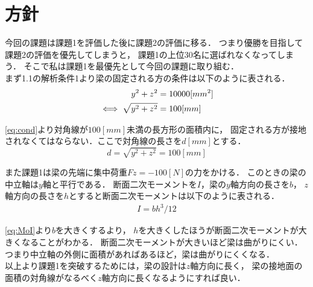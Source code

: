\section{方針}
  今回の課題は課題1を評価した後に課題2の評価に移る．
  つまり優勝を目指して課題2の評価を優先してしまうと，
  課題1の上位30名に選ばれなくなってしまう．
  そこで私は課題1を最優先として今回の課題に取り組む．\\\indent
  まず1.1の解析条件1より梁の固定される方の条件は以下のように表される．
  \begin{align}
    y^2+z^2&=10000[mm^2] \notag \\
    \iff \sqrt{y^2+z^2}&=100[mm] \label{eq:cond}
  \end{align}

  \eqref{eq:cond}より対角線が$100[mm]$未満の長方形の面積内に，
  固定される方が接地されなくてはならない．ここで対角線の長さを$d[mm]$とする．
  \begin{equation}
    d = \sqrt{y^2 + z^2} = 100[mm] \label{eq:diag}
  \end{equation}

  また課題1は梁の先端に集中荷重$Fz=-100[N]$の力をかける．
  このときの梁の中立軸は$y$軸と平行である．
  断面二次モーメントを$I$，梁の$y$軸方向の長さを$b$，
  $z$軸方向の長さを$h$とすると断面二次モーメントは以下のように表される．
  \begin{align}
    I=bh^3/12 \label{eq:MoI}
  \end{align}

  \eqref{eq:MoI}より$b$を大きくするより，
  $h$を大きくしたほうが断面二次モーメントが大きくなることがわかる．
  断面二次モーメントが大きいほど梁は曲がりにくい．
  つまり中立軸の外側に面積があればあるほど，梁は曲がりにくくなる．\\\indent
  以上より課題1を突破するためには，梁の設計は$z$軸方向に長く，
  梁の接地面の面積の対角線がなるべく$z$軸方向に長くなるようにすれば良い．
